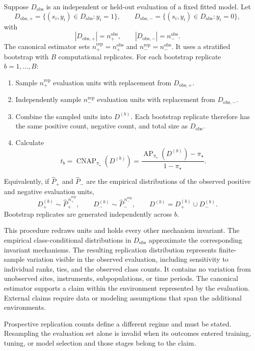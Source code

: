 \documentclass[11pt]{article}
\newcommand{\AP}{\operatorname{AP}}
\newcommand{\CNAP}{\operatorname{CNAP}}
\newcommand{\Tpi}{\CNAP_{\pi_\star}}
\theoremstyle{remark}
\begin{document}
Suppose $D_{\mathrm{obs}}$ is an independent or held-out evaluation of a fixed fitted model. Let
\[
D_{\mathrm{obs},+}
=
\{(s_i,y_i)\in D_{\mathrm{obs}}:y_i=1\},
\qquad
D_{\mathrm{obs},-}
=
\{(s_i,y_i)\in D_{\mathrm{obs}}:y_i=0\},
\]
with
\[
|D_{\mathrm{obs},+}|=n_+^{\mathrm{obs}},
\qquad
|D_{\mathrm{obs},-}|=n_-^{\mathrm{obs}}.
\]
The canonical estimator sets $n_+^{\mathrm{rep}}=n_+^{\mathrm{obs}}$ and $n_-^{\mathrm{rep}}=n_-^{\mathrm{obs}}$. It uses a stratified bootstrap with $B$ computational replicates. For each bootstrap replicate $b=1,\ldots,B$:
\begin{enumerate}
\item Sample $n_+^{\mathrm{rep}}$ evaluation units with replacement from $D_{\mathrm{obs},+}$.
\item Independently sample $n_-^{\mathrm{rep}}$ evaluation units with replacement from $D_{\mathrm{obs},-}$.
\item Combine the sampled units into $D^{(b)}$. Each bootstrap replicate therefore has the same positive count, negative count, and total size as $D_{\mathrm{obs}}$.
\item Calculate
\[
t_b=\Tpi(D^{(b)})
=
\frac{\AP_{\pi_\star}(D^{(b)})-\pi_\star}{1-\pi_\star}.
\]
\end{enumerate}

Equivalently, if $\widehat P_+$ and $\widehat P_-$ are the empirical distributions of the observed positive and negative evaluation units,
\[
D_+^{(b)}\sim \widehat P_+^{\,n_+^{\mathrm{rep}}},
\qquad
D_-^{(b)}\sim \widehat P_-^{\,n_-^{\mathrm{rep}}},
\qquad
D^{(b)}=D_+^{(b)}\cup D_-^{(b)}.
\]
Bootstrap replicates are generated independently across $b$.

This procedure redraws units and holds every other mechanism invariant. The empirical class-conditional distributions in $D_{\mathrm{obs}}$ approximate the corresponding invariant mechanisms. The resulting replication distribution represents finite-sample variation visible in the observed evaluation, including sensitivity to individual ranks, ties, and the observed class counts. It contains no variation from unobserved sites, instruments, subpopulations, or time periods. The canonical estimator supports a claim within the environment represented by the evaluation. External claims require data or modeling assumptions that span the additional environments.

Prospective replication counts define a different regime and must be stated. Resampling the evaluation set alone is invalid when its outcomes entered training, tuning, or model selection and those stages belong to the claim.
\end{document}
